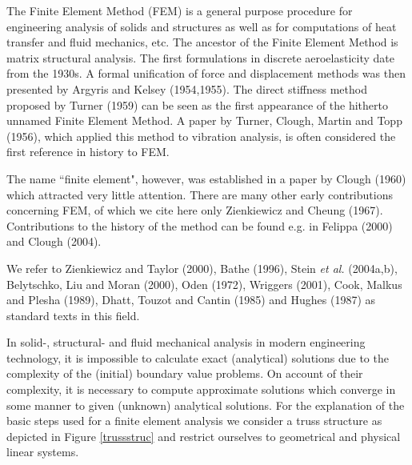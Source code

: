 \label{FEM1}

The Finite Element Method (FEM) is a general purpose procedure for engineering
analysis of solids and structures as well as for computations 
of heat transfer and fluid mechanics, etc.
The ancestor of the Finite Element Method is matrix structural analysis.
The first formulations in discrete aeroelasticity date from the 1930s.
A formal unification of force and displacement methods was then presented by Argyris and
Kelsey (1954,1955). The direct stiffness method proposed by Turner (1959) can be seen as the 
first appearance of the hitherto unnamed Finite Element Method. A paper by Turner, Clough, 
Martin and Topp (1956), which applied this method to vibration analysis, is often considered 
the first reference in history to FEM.
 
The name ``finite element", however, was established in a paper by Clough (1960)
which attracted very little attention. There are many other early 
contributions concerning FEM, of which we cite here only Zienkiewicz and Cheung (1967).
Contributions to the history of the method can be found e.g. in Felippa (2000) and
Clough (2004).

We refer to Zienkiewicz and Taylor  (2000), Bathe (1996), Stein {\it et al.} (2004a,b),
Belytschko, Liu and Moran (2000), Oden (1972), Wriggers (2001), Cook, Malkus and Plesha (1989),
Dhatt, Touzot and Cantin (1985) and Hughes (1987) as standard texts in this field.




\label{Illustration of the Finite Element Concept}

In solid-, structural- and fluid mechanical analysis in
modern engineering technology, it is impossible to calculate exact (analytical)
solutions due to the complexity of the (initial) boundary value problems.
On account of their complexity, it is necessary to compute approximate solutions
which converge in some manner to given (unknown) analytical solutions.
For the explanation of the basic steps used for a finite
element analysis we consider a truss structure as depicted in Figure
\ref{trussstruc} and restrict ourselves to geometrical and physical 
linear systems.

